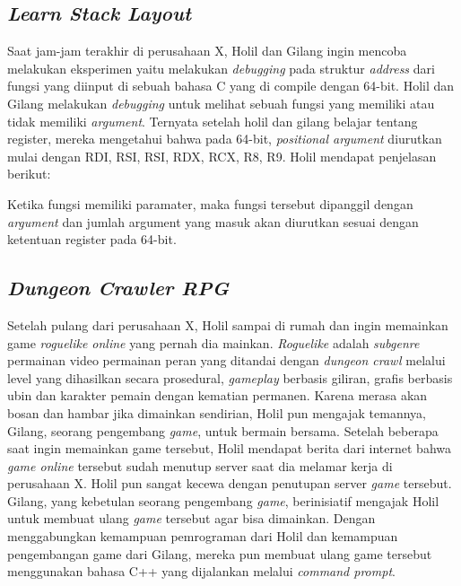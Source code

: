 \documentclass[../main.tex]{subfiles}
\begin{document}
\subsection{\textit{Learn Stack Layout}}
Saat jam-jam terakhir di perusahaan X, Holil dan Gilang ingin mencoba melakukan eksperimen yaitu melakukan \textit{debugging} pada struktur \textit{address} dari fungsi yang diinput di sebuah bahasa C yang di compile dengan 64-bit. Holil dan Gilang melakukan \textit{debugging} untuk melihat sebuah fungsi yang memiliki atau tidak memiliki \textit{argument}. Ternyata setelah holil dan gilang belajar tentang register, mereka mengetahui bahwa pada 64-bit, \textit{positional argument} diurutkan mulai dengan RDI, RSI, RSI, RDX, RCX, R8, R9. Holil mendapat penjelasan berikut:

Ketika fungsi memiliki paramater, maka fungsi tersebut dipanggil dengan \textit{argument} dan jumlah argument yang masuk akan diurutkan sesuai dengan ketentuan register pada 64-bit.

\vspace*{1.6ex}

\subsection{\textit{Dungeon Crawler RPG}}

Setelah pulang dari perusahaan X, Holil sampai di rumah dan ingin memainkan game \textit{roguelike online} yang pernah dia mainkan. \textit{Roguelike} adalah \textit{subgenre} permainan video permainan peran yang ditandai dengan \textit{dungeon crawl} melalui level yang dihasilkan secara prosedural, \textit{gameplay} berbasis giliran, grafis berbasis ubin dan karakter pemain dengan kematian permanen. Karena merasa akan bosan dan hambar jika dimainkan sendirian, Holil pun mengajak temannya, Gilang, seorang pengembang \textit{game}, untuk bermain bersama. Setelah beberapa saat ingin memainkan game tersebut, Holil mendapat berita dari internet bahwa \textit{game online} tersebut sudah menutup server saat dia melamar kerja di perusahaan X. Holil pun sangat kecewa dengan penutupan server \textit{game} tersebut. Gilang, yang kebetulan seorang pengembang \textit{game}, berinisiatif mengajak Holil untuk membuat ulang \textit{game} tersebut agar bisa dimainkan. Dengan menggabungkan kemampuan pemrograman dari Holil dan kemampuan pengembangan game dari Gilang, mereka pun membuat ulang game tersebut menggunakan bahasa C++ yang dijalankan melalui \textit{command prompt}.
\end{document}
